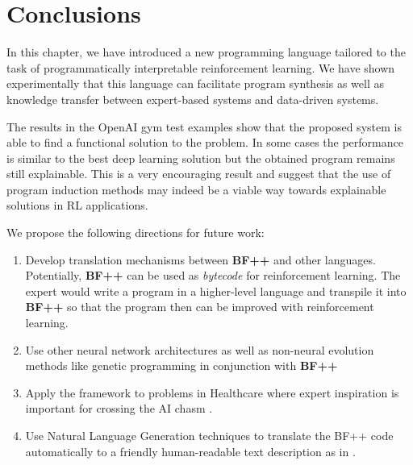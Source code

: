 \newpage
\section{Conclusions}

In this chapter, we have introduced a new programming language tailored to the task of programmatically interpretable reinforcement learning.
We have shown experimentally that this language can facilitate program synthesis as well as knowledge transfer between expert-based systems and data-driven systems. 

The results in the OpenAI gym test examples show that the proposed system is able to find a functional solution to the problem. In some cases the performance is similar to the best deep learning solution but the obtained program remains still explainable. This is a very encouraging result and suggest that the use of program induction methods may indeed be a viable way towards explainable solutions in RL applications. 

We propose the following directions for future work:
\begin{enumerate}
    \item Develop translation mechanisms between \textbf{BF++} and other languages. Potentially, \textbf{BF++} can be used as \emph{bytecode} \cite{bytecode} for reinforcement learning. The expert would write a program in a higher-level language and transpile it into \textbf{BF++} so that the program then can be improved with reinforcement learning.
    \item Use other neural network architectures as well as non-neural evolution methods like genetic programming \cite{genprog1,genprog2} in conjunction with \textbf{BF++}
    \item Apply the framework to problems in Healthcare where expert inspiration is important for crossing the AI chasm \cite{aichasm}.    \item Use Natural Language Generation techniques to translate the BF++ code automatically to a friendly human-readable text description as in \cite{richardsonCode2TextChallengeText2017,code2nlg2}.
\end{enumerate}